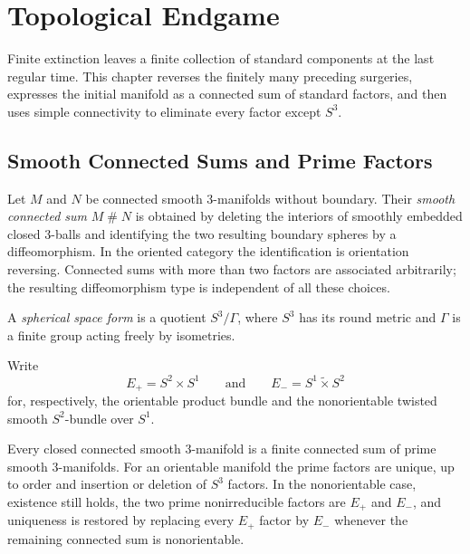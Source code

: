 \chapter{Topological Endgame}

Finite extinction leaves a finite collection of standard components at the
last regular time.  This chapter reverses the finitely many preceding
surgeries, expresses the initial manifold as a connected sum of standard
factors, and then uses simple connectivity to eliminate every factor except
$S^3$.

\section{Smooth Connected Sums and Prime Factors}

\begin{definition}
\label{def:smooth-connected-sum}
\notready
Let $M$ and $N$ be connected smooth $3$-manifolds without boundary.  Their
\emph{smooth connected sum} $M\mathbin{\#}N$ is obtained by deleting the
interiors of smoothly embedded closed $3$-balls and identifying the two
resulting boundary spheres by a diffeomorphism.  In the oriented category the
identification is orientation reversing.  Connected sums with more than two
factors are associated arbitrarily; the resulting diffeomorphism type is
independent of all these choices.
\end{definition}

\begin{definition}
\label{def:spherical-space-form}
\notready
A \emph{spherical space form} is a quotient $S^3/\Gamma$, where $S^3$ has
its round metric and $\Gamma$ is a finite group acting freely by isometries.
\end{definition}

\begin{definition}
\label{def:sphere-bundles-over-circle}
\notready
Write
\[
 E_+=S^2\times S^1
 \qquad\text{and}\qquad
 E_-=S^1\mathbin{\widetilde\times}S^2
\]
for, respectively, the orientable product bundle and the nonorientable
twisted smooth $S^2$-bundle over $S^1$.
\end{definition}

\begin{theorem}
\label{thm:prime-decomposition-interface}
\notready
Every closed connected smooth $3$-manifold is a finite connected sum of prime
smooth $3$-manifolds.  For an orientable manifold the prime factors are unique,
up to order and insertion or deletion of $S^3$ factors.  In the nonorientable
case, existence still holds, the two prime nonirreducible factors are $E_+$ and
$E_-$, and uniqueness is restored by replacing every $E_+$ factor by $E_-$
whenever the remaining connected sum is nonorientable.
\end{theorem}

